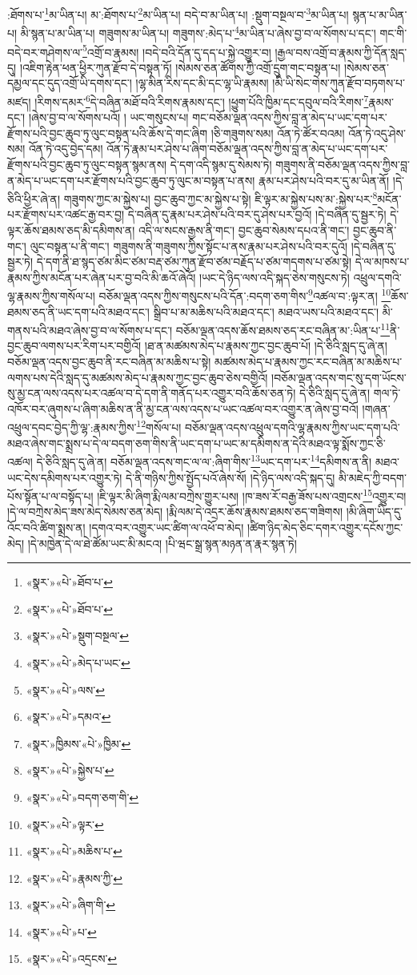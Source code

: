:ཐོགས་པ་\footnote{«སྣར་»«པེ་»ཐོབ་པ་}མ་ཡིན་པ། མ་:ཐོགས་པ་\footnote{«སྣར་»«པེ་»ཐོབ་པ་}མ་ཡིན་པ། བདེ་བ་མ་ཡིན་པ། :སྡུག་བསྔལ་བ་\footnote{«སྣར་»«པེ་»སྡུག་བསྔལ་}མ་ཡིན་པ། སྙན་པ་མ་ཡིན་པ། མི་སྙན་པ་མ་ཡིན་པ། གཟུགས་མ་ཡིན་པ། གཟུགས་:མེད་པ་\footnote{«སྣར་»«པེ་»མེད་པ་ཡང་}མ་ཡིན་པ་ཞེས་བྱ་བ་ལ་སོགས་པ་དང་། གང་གི་བདེ་བར་གཤེགས་ལ་\footnote{«སྣར་»«པེ་»ལས་}འགྲོ་བ་རྣམས། །བདེ་བའི་དོན་དུ་དད་པ་སྐྱེ་འགྱུར་བ། །རྒྱལ་བས་འགྲོ་བ་རྣམས་ཀྱི་དོན་སླད་དུ། །འཇིག་རྟེན་ཕན་ཕྱིར་ཀུན་རྫོབ་དེ་བསྟན་ཏོ། །སེམས་ཅན་ཚོགས་ཀྱི་འགྲོ་དྲུག་གང་བསྟན་པ། །སེམས་ཅན་དམྱལ་དང་དུད་འགྲོ་ཡི་དགས་དང་། །ལྷ་མིན་རིས་དང་མི་དང་ལྷ་ཡི་རྣམས། །མི་ཡི་སེང་གེས་ཀུན་རྫོབ་བཏགས་པ་མཛད། །རིགས་དམར་\footnote{«སྣར་»«པེ་»དམའ་}དེ་བཞིན་མཐོ་བའི་རིགས་རྣམས་དང་། །ཕྱུག་པོའི་ཁྱིམ་དང་དབུལ་བའི་རིགས་\footnote{«སྣར་»ཁྱིམས་«པེ་»ཁྱིམ་}རྣམས་དང་། །ཞེས་བྱ་བ་ལ་སོགས་པའོ། །
ཡང་གསུངས་པ། གང་བཅོམ་ལྡན་འདས་ཀྱིས་བླ་ན་མེད་པ་ཡང་དག་པར་རྫོགས་པའི་བྱང་ཆུབ་ཏུ་ལུང་བསྟན་པའི་ཆོས་དེ་གང་ཞིག །ཅི་གཟུགས་སམ། འོན་ཏེ་ཚོར་བའམ། འོན་ཏེ་འདུ་ཤེས་སམ། འོན་ཏེ་འདུ་བྱེད་དམ། འོན་ཏེ་རྣམ་པར་ཤེས་པ་ཞིག་བཅོམ་ལྡན་འདས་ཀྱིས་བླ་ན་མེད་པ་ཡང་དག་པར་རྫོགས་པའི་བྱང་ཆུབ་ཏུ་ལུང་བསྟན་སྙམ་ནས། དེ་དག་འདི་སྙམ་དུ་སེམས་ཏེ། གཟུགས་ནི་བཅོམ་ལྡན་འདས་ཀྱིས་བླ་ན་མེད་པ་ཡང་དག་པར་རྫོགས་པའི་བྱང་ཆུབ་ཏུ་ལུང་མ་བསྟན་པ་ནས། རྣམ་པར་ཤེས་པའི་བར་དུ་མ་ཡིན་ནོ། །དེ་ཅིའི་ཕྱིར་ཞེ་ན། གཟུགས་ཀྱང་མ་སྐྱེས་པ། བྱང་ཆུབ་ཀྱང་མ་སྐྱེས་པ་སྟེ། ཇི་ལྟར་མ་སྐྱེས་པས་མ་:སྐྱེས་པར་\footnote{«སྣར་»«པེ་»སྐྱེས་པ་}མངོན་པར་རྫོགས་པར་འཚང་རྒྱ་བར་བྱ། དེ་བཞིན་དུ་རྣམ་པར་ཤེས་པའི་བར་དུ་ཤེས་པར་བྱའོ། །དེ་བཞིན་དུ་སྦྱར་ཏེ། དེ་ལྟར་ཆོས་ཐམས་ཅད་མི་དམིགས་ན། འདི་ལ་སངས་རྒྱས་ནི་གང་། བྱང་ཆུབ་སེམས་དཔའ་ནི་གང་། བྱང་ཆུབ་ནི་གང་། ལུང་བསྟན་པ་ནི་གང་། གཟུགས་ནི་གཟུགས་ཀྱིས་སྟོང་པ་ནས་རྣམ་པར་ཤེས་པའི་བར་དུའོ། །དེ་བཞིན་དུ་སྦྱར་ཏེ། དེ་དག་ནི་ཐ་སྙད་ཙམ་མིང་ཙམ་བརྡ་ཙམ་ཀུན་རྫོབ་ཙམ་བརྗོད་པ་ཙམ་གདགས་པ་ཙམ་སྟེ། དེ་ལ་མཁས་པ་རྣམས་ཀྱིས་མངོན་པར་ཞེན་པར་བྱ་བའི་མི་ཆའོ་ཞེའོ། །ཡང་དེ་ཉིད་ལས་འདི་སྐད་ཅེས་གསུངས་ཏེ། འཕྲུལ་དགའི་ལྷ་རྣམས་ཀྱིས་གསོལ་པ། བཅོམ་ལྡན་འདས་ཀྱིས་གསུངས་པའི་དོན་:བདག་ཅག་གིས་\footnote{«སྣར་»«པེ་»བདག་ཅག་གི་}འཚལ་བ་:ལྟར་ན། \footnote{«སྣར་»«པེ་»ལྟར་}ཆོས་ཐམས་ཅད་ནི་ཡང་དག་པའི་མཐའ་དང་། སྒྲིབ་པ་མ་མཆིས་པའི་མཐའ་དང་། མཐའ་ཡས་པའི་མཐའ་དང་། མི་གནས་པའི་མཐའ་ཞེས་བྱ་བ་ལ་སོགས་པ་དང་། བཅོམ་ལྡན་འདས་ཆོས་ཐམས་ཅད་རང་བཞིན་མ་:ཡིན་པ་\footnote{«སྣར་»«པེ་»མཆིས་པ་}ནི་བྱང་ཆུབ་ལགས་པར་རིག་པར་བགྱིའོ། །ཐ་ན་མཚམས་མེད་པ་རྣམས་ཀྱང་བྱང་ཆུབ་པོ། །དེ་ཅིའི་སླད་དུ་ཞེ་ན། བཅོམ་ལྡན་འདས་བྱང་ཆུབ་ནི་རང་བཞིན་མ་མཆིས་པ་སྟེ། མཚམས་མེད་པ་རྣམས་ཀྱང་རང་བཞིན་མ་མཆིས་པ་ལགས་པས་དེའི་སླད་དུ་མཚམས་མེད་པ་རྣམས་ཀྱང་བྱང་ཆུབ་ཅེས་བགྱིའོ། །བཅོམ་ལྡན་འདས་གང་སུ་དག་ཡོངས་སུ་མྱ་ངན་ལས་འདས་པར་འཚལ་བ་དེ་དག་ནི་གནོད་པར་འགྱུར་བའི་ཆོས་ཅན་ཏེ། དེ་ཅིའི་སླད་དུ་ཞེ་ན། གལ་ཏེ་འཁོར་བར་ཞུགས་པ་ཞིག་མཆིས་ན་ནི་མྱ་ངན་ལས་འདས་པ་ཡང་འཚལ་བར་འགྱུར་ན་ཞེས་བྱ་བའོ། །གཞན་འཕྲུལ་དབང་བྱེད་ཀྱི་ལྷ་:རྣམས་ཀྱིས་\footnote{«སྣར་»«པེ་»རྣམས་ཀྱི་}གསོལ་པ། བཅོམ་ལྡན་འདས་འཕྲུལ་དགའི་ལྷ་རྣམས་ཀྱིས་ཡང་དག་པའི་མཐའ་ཞེས་གང་སྨྲས་པ་དེ་ལ་བདག་ཅག་གིས་ནི་ཡང་དག་པ་ཡང་མ་དམིགས་ན་དེའི་མཐའ་ལྟ་སྨོས་ཀྱང་ཅི་འཚལ། དེ་ཅིའི་སླད་དུ་ཞེ་ན། བཅོམ་ལྡན་འདས་གང་ལ་ལ་:ཞིག་གིས་\footnote{«སྣར་»«པེ་»ཞིག་གི་}ཡང་དག་པར་\footnote{«སྣར་»«པེ་»པ་}དམིགས་ན་ནི། མཐའ་ཡང་དེས་དམིགས་པར་འགྱུར་ཏེ། དེ་ནི་གཉིས་ཀྱིས་སྤྱོད་པའོ་ཞེས་སོ། །དེ་ཉིད་ལས་འདི་སྐད་དུ། མི་མཇེད་ཀྱི་བདག་པོས་སྟོན་པ་ལ་བསྟོད་པ། །ཇི་ལྟར་མི་ཞིག་རྨི་ལམ་བཀྲེས་གྱུར་པས། །ཁ་ཟས་རོ་བརྒྱ་ཟོས་པས་འགྲངས་\footnote{«སྣར་»«པེ་»འདྲངས་}འགྱུར་བ། །དེ་ལ་བཀྲེས་མེད་ཟས་མེད་སེམས་ཅན་མེད། །རྨི་ལམ་དེ་འདྲར་ཆོས་རྣམས་ཐམས་ཅད་གཟིགས། །མི་ཞིག་ཡིད་དུ་འོང་བའི་ཚིག་སྨྲས་ན། །དགའ་བར་འགྱུར་ཡང་ཚིག་ལ་འཕོ་བ་མེད། །ཚིག་ཉིད་མེད་ཅིང་དགར་འགྱུར་དངོས་ཀྱང་མེད། །དེ་མཁྱེན་དེ་ལ་ཐེ་ཚོམ་ཡང་མི་མངའ། །པི་ཝང་སྒྲ་སྙན་མཉན་ན་རྣར་སྙན་ཏེ། 